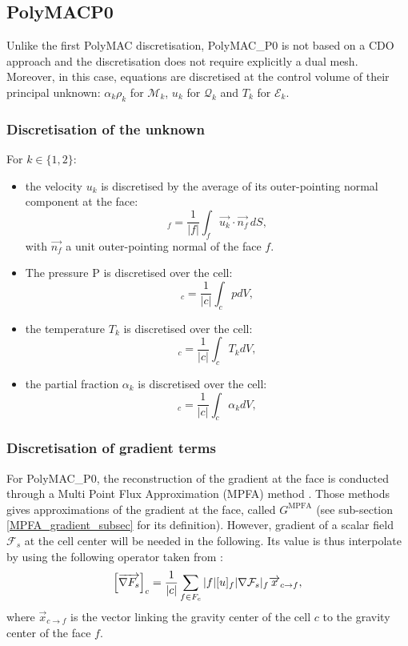 \subsection{PolyMAC\textunderscore{}P0}
Unlike the first PolyMAC discretisation, PolyMAC\_P0 is not based on a CDO approach and the discretisation does not require explicitly a dual mesh. Moreover, in this case, equations are discretised at the control volume of their principal unknown: $\alpha _k \rho _k$ for $\mathcal{M}_k$, $u_k$ for $\mathcal{Q}_k$ and $T_k$ for $\mathcal{E}_k$.

\subsubsection{Discretisation of the unknown}
For $k \in \{1,2\}$:
\begin{itemize}
    \item the velocity $ u_k $ is discretised by the average of its outer-pointing normal component at the face:
    \begin{equation}
        [u_k] _f = \frac{1}{|f|} \int _f \vec{u_k} \cdot \vec{n_f} \,  dS,
    \end{equation}
    with $\vec{n_f}$ a unit outer-pointing normal of the face $f$.
    \item The pressure P is discretised over the cell:
    \begin{equation}
        [P]_c = \frac{1}{|c|} \int _c p dV,
    \end{equation}
    \item the temperature $T_k$ is discretised over the cell:
    \begin{equation}
        [T_k]_c = \frac{1}{|c|} \int _c T_k dV,
    \end{equation}
    \item the partial fraction $ \alpha _k$ is discretised over the cell:
    \begin{equation}
        [\alpha _k]_c = \frac{1}{|c|} \int _c \alpha _k dV,
    \end{equation}
\end{itemize}
\subsubsection*{Discretisation of gradient terms}
For PolyMAC\_P0, the reconstruction of the gradient at the face is conducted through a Multi Point Flux Approximation (MPFA) method \cite[section 4.1]{droniou2018gradient}. Those methods gives approximations of the gradient at the face, called $G^{\text{MPFA}}$ (see sub-section \ref{MPFA_gradient_subsec} for its definition). However, gradient of a scalar field $\mathcal{F}_s$ at the cell center will be needed in the following. Its value is thus interpolate by using the following operator taken from \textcite{bonelle2014}:
\begin{equation}
    \left[ \overrightarrow{\nabla F_s} \right]_c = \frac{1}{|c|} \sum _{f \in F_c} |f| [u]_f |\nabla  \mathcal{F}_s |_f \overrightarrow{x}_{c \rightarrow f},
\end{equation}
where $\vec{x}_{c \rightarrow f}$ is the vector linking the gravity center of the cell $c$ to the gravity center of the face $f$.

